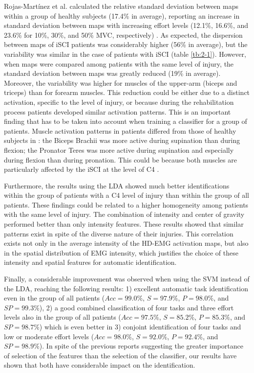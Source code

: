 Rojas-Martínez et al. calculated the relative standard deviation between maps within a group of healthy subjects (17.4\% in average), reporting an increase in standard deviation between maps with increasing effort levels (12.1\%, 16.6\%, and 23.6\% for 10\%, 30\%, and 50\% MVC, respectively) \citep{Rojas-Martinez2012}. As expected, the dispersion between maps of iSCI patients was considerably higher (56\% in average), but the variability was similar in the case of patients with iSCI (table \ref{tb:2-1}). However, when maps were compared among patients with the same level of injury, the standard deviation between maps was greatly reduced (19\% in average). Moreover, the variability was higher for muscles of the upper-arm (biceps and triceps) than for forearm muscles. This reduction could be either due to a distinct activation, specific to the level of injury, or because during the rehabilitation process patients developed similar activation patterns. This is an important finding that has to be taken into account when training a classifier for a group of patients. Muscle activation patterns in patients differed from those of healthy subjects in \citep{Rojas-Martinez2012}: the Biceps Brachii was more active during supination than during flexion; the Pronator Teres was more active during supination and especially during flexion than during pronation. This could be because both muscles are particularly affected by the iSCI at the level of C4 \citep{Young-SCI}.

Furthermore, the results using the LDA showed much better identifications within the group of patients with a C4 level of injury than within the group of all patients. These findings could be related to a higher homogeneity among patients with the same level of injury. The combination of intensity and center of gravity performed better than only intensity features. These results showed that similar patterns exist in spite of the diverse nature of their injuries. This correlation exists not only in the average intensity of the HD-EMG activation maps, but also in the spatial distribution of EMG intensity, which justifies the choice of these intensity and spatial features for automatic identification.

Finally, a considerable improvement was observed when using the SVM instead of the LDA, reaching the following results: 1) excellent automatic task identification even in the group of all patients ($Acc=99.0\%$, $S=97.9\%$, $P=98.0\%$, and $SP=99.3\%$), 2) a good combined classification of four tasks and three effort levels also in the group of all patients ($Acc=97.5\%$, $S=85.2\%$, $P=85.3\%$, and $SP=98.7\%$) which is even better in 3) conjoint identification of four tasks and low or moderate effort levels ($Acc=98.0\%$, $S=92.0\%$, $P=92.4\%$, and $SP=98.9\%$). In spite of the previous reports suggesting the greater importance of selection of the features than the selection of the classifier, our results have shown that both have considerable impact on the identification.

